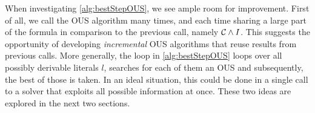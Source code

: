 When investigating \cref{alg:bestStepOUS}, we see ample room for improvement. 
First of all, we call the OUS algorithm many times, and each time sharing a large part of the formula in comparison to the previous call, namely $\mathcal{C}  \land I$.
This suggests the opportunity of developing \emph{incremental} OUS algorithms that reuse results from previous calls. 
More generally, the loop in \cref{alg:bestStepOUS} loops over all possibly derivable  literals $l$, searches for each of them an OUS and subsequently, the best of those is taken. 
In an ideal situation, this could be done in a single call to a solver that exploits all possible information at once. 
These two ideas are explored in the next two sections.
